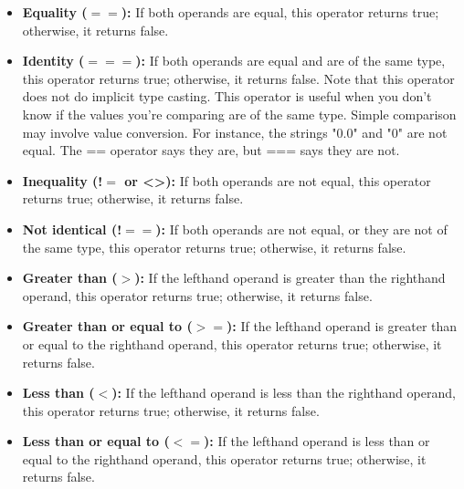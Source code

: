 \documentclass{report}
\begin{document}
\begin{itemize}
    \item \textbf{Equality ($==$):} If both operands are equal, this operator returns true; otherwise, it returns false.
    \item \textbf{Identity ($===$):} If both operands are equal and are of the same type, this operator returns true; otherwise, it returns false. Note that this operator does not do implicit type casting. This operator is useful when you don’t know if the values you’re comparing are of the same type. Simple comparison may involve value conversion. For instance, the strings "0.0" and "0" are not equal. The == operator says they are, but === says they are not.
    \item \textbf{Inequality (!$=$ or <>):} If both operands are not equal, this operator returns true; otherwise, it returns false.
    \item \textbf{Not identical (!$==$):} If both operands are not equal, or they are not of the same type, this operator returns true; otherwise, it returns false.
    \item \textbf{Greater than ($>$):} If the lefthand operand is greater than the righthand operand, this operator returns true; otherwise, it returns false.
    \item \textbf{Greater than or equal to ($>=$):} If the lefthand operand is greater than or equal to the righthand operand, this operator returns true; otherwise, it returns false.
    \item \textbf{Less than ($<$):} If the lefthand operand is less than the righthand operand, this operator returns true; otherwise, it returns false.
    \item \textbf{Less than or equal to ($<=$):} If the lefthand operand is less than or equal to the righthand operand, this operator returns true; otherwise, it returns false.
\end{itemize}

\pagebreak 
\bigbreak \noindent 
\end{document}
